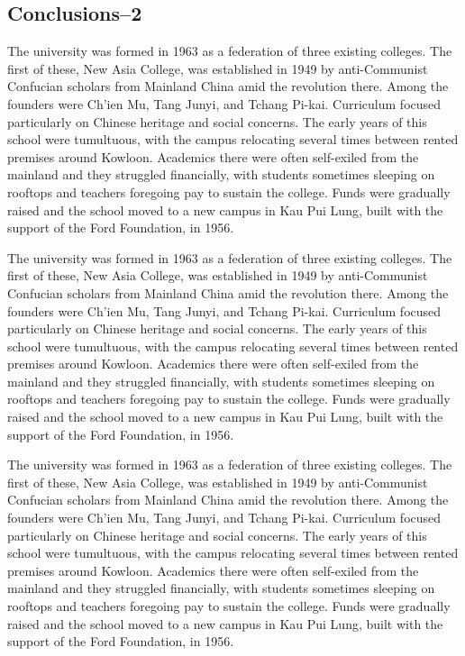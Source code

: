 \subsection{Conclusions--2}
The university was formed in 1963 as a federation of three existing colleges. The first of these, New Asia College, was established in 1949 by anti-Communist Confucian scholars from Mainland China amid the revolution there. Among the founders were Ch'ien Mu, Tang Junyi, and Tchang Pi-kai. Curriculum focused particularly on Chinese heritage and social concerns. The early years of this school were tumultuous, with the campus relocating several times between rented premises around Kowloon. Academics there were often self-exiled from the mainland and they struggled financially, with students sometimes sleeping on rooftops and teachers foregoing pay to sustain the college. Funds were gradually raised and the school moved to a new campus in Kau Pui Lung, built with the support of the Ford Foundation, in 1956.

The university was formed in 1963 as a federation of three existing colleges. The first of these, New Asia College, was established in 1949 by anti-Communist Confucian scholars from Mainland China amid the revolution there. Among the founders were Ch'ien Mu, Tang Junyi, and Tchang Pi-kai. Curriculum focused particularly on Chinese heritage and social concerns. The early years of this school were tumultuous, with the campus relocating several times between rented premises around Kowloon. Academics there were often self-exiled from the mainland and they struggled financially, with students sometimes sleeping on rooftops and teachers foregoing pay to sustain the college. Funds were gradually raised and the school moved to a new campus in Kau Pui Lung, built with the support of the Ford Foundation, in 1956.


The university was formed in 1963 as a federation of three existing colleges. The first of these, New Asia College, was established in 1949 by anti-Communist Confucian scholars from Mainland China amid the revolution there. Among the founders were Ch'ien Mu, Tang Junyi, and Tchang Pi-kai. Curriculum focused particularly on Chinese heritage and social concerns. The early years of this school were tumultuous, with the campus relocating several times between rented premises around Kowloon. Academics there were often self-exiled from the mainland and they struggled financially, with students sometimes sleeping on rooftops and teachers foregoing pay to sustain the college. Funds were gradually raised and the school moved to a new campus in Kau Pui Lung, built with the support of the Ford Foundation, in 1956.

